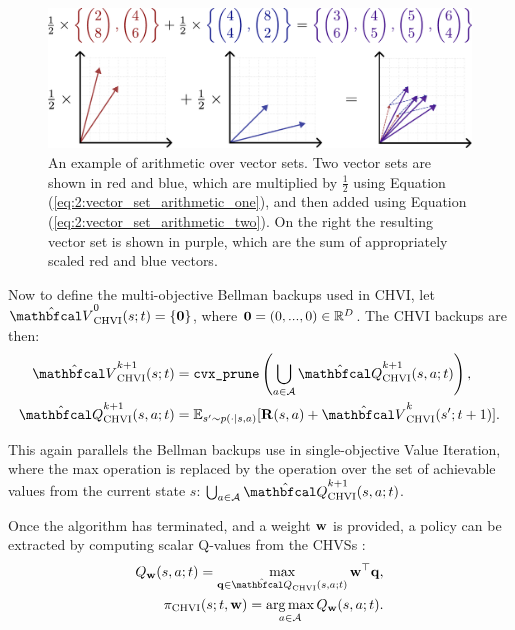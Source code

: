         \begin{figure}
            \centering\includegraphics[width=1.0\textwidth]{figures/ch2/ch_arithmetic.pdf} 
            \caption[An example of arithmetic over vector sets.]{An example of arithmetic over vector sets. Two vector sets are shown in red and blue, which are multiplied by $\frac{1}{2}$ using Equation (\ref{eq:2:vector_set_arithmetic_one}), and then added using Equation (\ref{eq:2:vector_set_arithmetic_two}). On the right the resulting vector set is shown in purple, which are the sum of appropriately scaled red and blue vectors.}
            \label{fig:2:vectorset_arithmetic}
        \end{figure}

        Now to define the multi-objective Bellman backups used in CHVI, let $\Vchvi^0(s;t) = \{ \bff{0} \}$, where $\mathbf{0}=(0,...,0)\in\mathbb{R}^D$. The CHVI backups are then:
        \begin{align}
            \Vchvi^{k+1}(s;t) &= \cprune \left( \bigcup_{a\in\cl{A}} \Qchvi^{k+1}(s,a;t) \right), \label{eq:2:chvi_v_backup} \\
            \Qchvi^{k+1}(s,a;t) &= \bb{E}_{s'\sim p(\cdot|s,a)} [\bff{R}(s,a) + \Vchvi^k(s';t+1)]. \label{eq:2:chvi_q_backup}
        \end{align}
        
        This again parallels the Bellman backups use in single-objective Value Iteration, where the max operation is replaced by the \cprune\ewe operation over the set of achievable values from the current state $s$: $\bigcup_{a\in\cl{A}} \Qchvi^{k+1}(s,a;t)$.
        
        Once the algorithm has terminated, and a weight $\mathbf{w}$ is provided, a policy can be extracted by computing scalar Q-values from the CHVSs \cite{chvi}:
        \begin{align}
            Q_{\bff{w}}(s,a;t) = \max_{\bff{q}\in\Qchvi(s,a;t)} \bff{w}^\top \bff{q}, \label{eq:2:chvi_scalar_q_fn} \\
            \pichvi(s;t,\bff{w}) = \argmax_{a\in\cl{A}} Q_{\bff{w}}(s,a;t). \label{eq:2:chvi_policy}
        \end{align}

